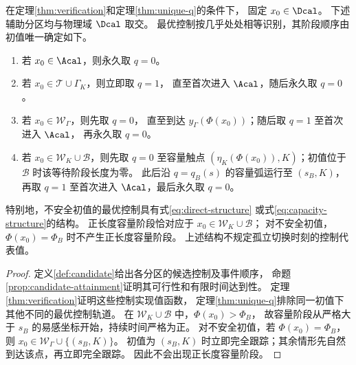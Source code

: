 \begin{corollary}[最优策略的分区表述]
\label{cor:optimal-synthesis}
在定理\ref{thm:verification}和定理\ref{thm:unique-q}的条件下，
固定 $x_0\in\Dcal$。
下述辅助分区均与物理域 $\Dcal$ 取交。
最优控制按几乎处处相等识别，其阶段顺序由初值唯一确定如下。
\begin{enumerate}[label=\textup{(\roman*)}]
\item 若 $x_0\in\Acal$，则永久取 $q=0$。
\item 若 $x_0\in\mathcal T\cup\Gamma_K$，则立即取 $q=1$，
直至首次进入 $\Acal$，随后永久取 $q=0$。
\item 若 $x_0\in\mathcal W_\Gamma$，则先取 $q=0$，
直至到达 $y_\Gamma(\Phi(x_0))$；随后取 $q=1$ 至首次进入 $\Acal$，
再永久取 $q=0$。
\item 若 $x_0\in\mathcal W_K\cup\mathcal B$，则先取 $q=0$ 至容量触点
$(\eta_K(\Phi(x_0)),K)$；初值位于 $\mathcal B$ 时该等待阶段长度为零。
此后沿 $q=q_B(s)$ 的容量弧运行至 $(s_B,K)$，
再取 $q=1$ 至首次进入 $\Acal$，最后永久取 $q=0$。
\end{enumerate}
特别地，不安全初值的最优控制具有式\eqref{eq:direct-structure}
或式\eqref{eq:capacity-structure}的结构。
正长度容量阶段恰对应于 $x_0\in\mathcal W_K\cup\mathcal B$；
对不安全初值，$\Phi(x_0)=\Phi_B$ 时不产生正长度容量阶段。
上述结构不规定孤立切换时刻的控制代表值。
\end{corollary}

\begin{proof}
定义\ref{def:candidate}给出各分区的候选控制及事件顺序，
命题\ref{prop:candidate-attainment}证明其可行性和有限时间达到性。
定理\ref{thm:verification}证明这些控制实现值函数，
定理\ref{thm:unique-q}排除同一初值下其他不同的最优控制轨道。
在 $\mathcal W_K\cup\mathcal B$ 中，$\Phi(x_0)>\Phi_B$，
故容量阶段从严格大于 $s_B$ 的易感坐标开始，持续时间严格为正。
对不安全初值，若 $\Phi(x_0)=\Phi_B$，则
$x_0\in\mathcal W_\Gamma\cup\{(s_B,K)\}$。
初值为 $(s_B,K)$ 时立即完全跟踪；其余情形先自然到达该点，再立即完全跟踪。
因此不会出现正长度容量阶段。
\end{proof}
